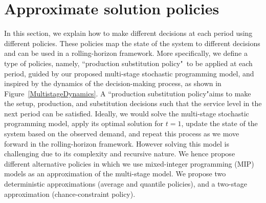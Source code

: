 \documentclass[11pt]{article}
\newcommand{\ti}{t} %
\newcommand{\jey}{j} %
\newcommand{\Es}{S} %
\newcommand{\Csub}{\mathcal{K}^+_k}
\newcommand{\Psub}{\mathcal{K}^-_k}
\newcommand{\PSpolicy}{``production substitution policy"}
\newcommand{\cred}{\color{black}}
\begin{document}
\begin{comment}
{\cred Note: I just keep this red part in case we need to have mathematical proof

In this model, it is not explicit that the recourse stage should be feasible. It is using the convention that if it is infeasible, the value function return infinite cost.}


{\cred * Given stage t and the history, $\xi^t, \exists x^t(\xi^t) \in \chi^t(x^t) \rightarrow v(\xi^t)$\\
$s.t.$ \\
$P_{\xi^{t+1}|\xi^t}\{v^{t}(\xi^t)-\sum_{\jey \in  \Csub}\Es_{kj}(\xi^{t+1})+\sum_{\jey \in  \Psub}\Es_{jk}(\xi^{t+1}) \geq D^{t+1}(\xi^{t+1}) $ for some $\Es_{kj}(\xi^{t+1}) , \Es_{jk}(\xi^{t+1}) \in  \chi ^{t+1}(\xi^{t+1}) \} \geq \alpha$ \\
This can be satisfied for instance if we have at least one uncapacitated product option (whether by its own production or substitution) for each product.

}
\end{comment}


\section{Approximate solution policies}
\label{sec:approx}

In this section, we explain how to make different decisions at each period using different policies. 
These policies map the state of the system to different decisions and can be used in a rolling-horizon framework. 
More specifically, we define a type of policies, namely, \PSpolicy \ to be applied at each period, guided by our proposed multi-stage stochastic programming model, and inspired by the dynamics of the decision-making process, as shown in Figure~\ref{MultistageDynamics}. A \PSpolicy aims to make the setup, production, and substitution decisions such that the service level in the next period can be satisfied.
Ideally, we would solve the multi-stage stochastic programming model, apply its optimal solution for $\ti =1$, update the state of the system based on the observed demand, and repeat this process as we move forward in the rolling-horizon framework. However solving this model is challenging due to its complexity and recursive nature. We hence propose different alternative policies in which we use mixed-integer programming (MIP) models as an approximation of the multi-stage model. We propose two deterministic approximations (average and quantile policies), and a two-stage approximation (chance-constraint policy). 
\end{document}
